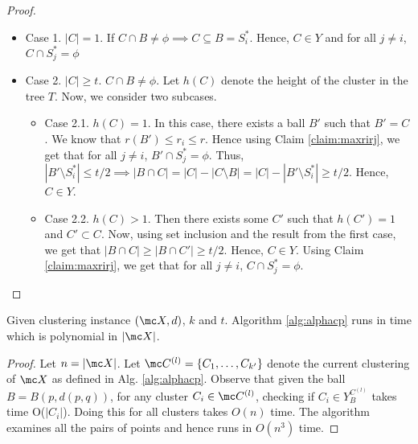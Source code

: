 \documentclass[11pt]{article}
\begin{document}
\begin{proof}
\begin{itemize}[nolistsep]
\item Case 1. $|C| = 1$. If $C \cap B \neq \phi \implies C \subseteq B = S_i^*$. Hence, $C \in Y$ and for all $j \neq i$, $C \cap S_j^* = \phi$

\item Case 2. $|C|\ge t$. $C \cap B \neq \phi$. Let $h(C)$ denote the height of the cluster in the tree $T$. Now, we consider two subcases.
\begin{itemize}
\renewcommand\labelitemii{$\circ$}
\item Case 2.1. $h(C) = 1$. In this case, there exists a ball $B'$ such that $B' = C$. We know that $r(B') \le r_i \le r$. Hence using Claim \ref{claim:maxrirj}, we get that for all $j \neq i$, $B' \cap S_j^* = \phi$. Thus, $|B'\setminus S_i^*| \le t/2 \implies |B\cap C| = |C| - |C\setminus B| = |C| - |B'\setminus S_i^*| \ge t/2$. Hence, $C \in Y$.

\item Case 2.2. $h(C) > 1$. Then there exists some $C'$ such that $h(C') = 1$ and $C' \subset C$. Now, using set inclusion and the result from the first case, we get that $|B\cap C| \ge |B\cap C'| \ge t/2$. Hence, $C \in Y$. Using Claim \ref{claim:maxrirj}, we get that for all $j \neq i$, $C \cap S_j^* = \phi$.
\end{itemize} 
\end{itemize}
\end{proof}

\begin{theorem}
Given clustering instance $(\mc X, d)$, $k$ and $t$. Algorithm \ref{alg:alphacp} runs in time which is polynomial in $|\mc X|$.
\end{theorem}

\begin{proof}
Let $n = |\mc X|$. Let $\mc C^{(l)} =\{C_1, \ldots, C_{k'}\}$ denote the current clustering of $\mc X$ as defined in Alg. \ref{alg:alphacp}. Observe that given the ball $B = B(p, d(p, q))$, for any cluster $C_i \in \mc C^{(l)}$, checking if $C_i \in Y_B^{C^{(l)}}$ takes time O($|C_i|$). Doing this for all clusters takes $O(n)$ time. The algorithm examines all the pairs of points and hence runs in $O(n^3)$ time.
\end{proof}
\end{document}
